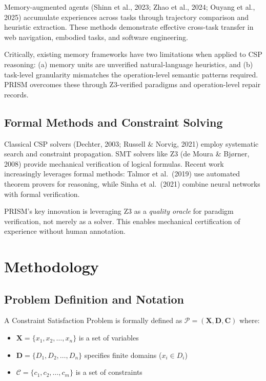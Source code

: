 \documentclass[letterpaper]{article}
\begin{document}
Memory-augmented agents (Shinn et al., 2023; Zhao et al., 2024; Ouyang et al., 2025) accumulate experiences across tasks through trajectory comparison and heuristic extraction. These methods demonstrate effective cross-task transfer in web navigation, embodied tasks, and software engineering.

Critically, existing memory frameworks have two limitations when applied to CSP reasoning: (a) memory units are unverified natural-language heuristics, and (b) task-level granularity mismatches the operation-level semantic patterns required. PRISM overcomes these through Z3-verified paradigms and operation-level repair records.

\subsection{Formal Methods and Constraint Solving}

Classical CSP solvers (Dechter, 2003; Russell \& Norvig, 2021) employ systematic search and constraint propagation. SMT solvers like Z3 (de Moura \& Bjørner, 2008) provide mechanical verification of logical formulas. Recent work increasingly leverages formal methods: Talmor et al.~(2019) use automated theorem provers for reasoning, while Sinha et al.~(2021) combine neural networks with formal verification.

PRISM's key innovation is leveraging Z3 as a \textit{quality oracle} for paradigm verification, not merely as a solver. This enables mechanical certification of experience without human annotation.


\section{Methodology}

\subsection{Problem Definition and Notation}

A Constraint Satisfaction Problem is formally defined as $\mathcal{P} = (\mathbf{X}, \mathbf{D}, \mathbf{C})$ where:
\begin{itemize}
    \item $\mathbf{X} = \{x_1, x_2, \ldots, x_n\}$ is a set of variables
    \item $\mathbf{D} = \{D_1, D_2, \ldots, D_n\}$ specifies finite domains ($x_i \in D_i$)
    \item $\mathcal{C} = \{c_1, c_2, \ldots, c_m\}$ is a set of constraints
\end{itemize}
\end{document}
